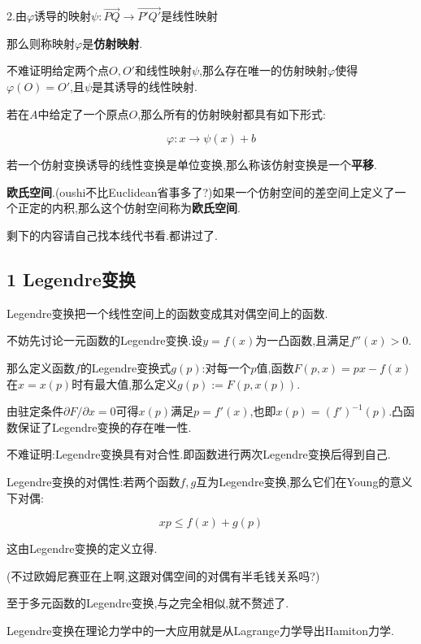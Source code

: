 \documentclass[UTF8]{article}
\begin{document}
	2.由$\varphi$诱导的映射$\psi: \overrightarrow{PQ} \rightarrow \overrightarrow{P'Q'}$是线性映射
	
	那么则称映射$\varphi$是\textbf{仿射映射}.
	
	不难证明给定两个点$O,O'$和线性映射$\psi$,那么存在唯一的仿射映射$\varphi$使得$\varphi(O)=O'$,且$\psi$是其诱导的线性映射.
	
	若在$A$中给定了一个原点$O$,那么所有的仿射映射都具有如下形式:
	
	\[\varphi: x \rightarrow \psi(x) + b\]
	
	若一个仿射变换诱导的线性变换是单位变换,那么称该仿射变换是一个\textbf{平移}.
	
	
	\textbf{欧氏空间}.(oushi不比Euclidean省事多了?)如果一个仿射空间的差空间上定义了一个正定的内积,那么这个仿射空间称为\textbf{欧氏空间}.
	
	剩下的内容请自己找本线代书看.都讲过了.
	
	\newpage
	
	
	
	
	
	
	
	
	
	
	
\subsection*{1 Legendre变换\cite{Anorld}}
	
	Legendre变换把一个线性空间上的函数变成其对偶空间上的函数.
	
	不妨先讨论一元函数的Legendre变换.设$y=f(x)$为一凸函数,且满足$f''(x)>0$.
	
	那么定义函数$f$的Legendre变换式$g(p)$:对每一个$p$值,函数$F(p,x)=px-f(x)$在$x=x(p)$时有最大值,那么定义$g(p):=F(p,x(p))$.
	
	由驻定条件$\partial F/\partial x=0$可得$x(p)$满足$p=f'(x)$,也即$x(p)=(f')^{-1}(p)$.凸函数保证了Legendre变换的存在唯一性.
	
	不难证明:Legendre变换具有对合性.即函数进行两次Legendre变换后得到自己.
	
	Legendre变换的对偶性:若两个函数$f,g$互为Legendre变换,那么它们在Young的意义下对偶:
	
	\[x p \le f(x)+g(p)\]
	
	这由Legendre变换的定义立得.
	
	(不过欧姆尼赛亚在上啊,这跟对偶空间的对偶有半毛钱关系吗?)
	
	至于多元函数的Legendre变换,与之完全相似,就不赘述了.
	
	Legendre变换在理论力学中的一大应用就是从Lagrange力学导出Hamiton力学.
	
\end{document}
